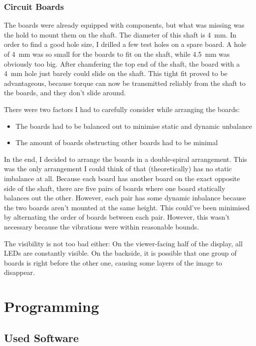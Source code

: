 \documentclass[a4paper, 11pt, titlepage]{report}
\begin{document}
\subsection{Circuit Boards}

The boards were already equipped with components, but what was missing was the hold to mount them
on the shaft. The diameter of this shaft is \SI{4}{\milli\meter}. In order to find a good hole
size, I drilled a few test holes on a spare board. A hole of \SI{4}{\milli\meter} was so small for
the boards to fit on the shaft, while \SI{4.5}{\milli\meter} was obviously too big. After
chamfering the top end of the shaft, the board with a \SI{4}{\milli\meter} hole just barely could
slide on the shaft. This tight fit proved to be advantageous, because torque can now be
transmitted reliably from the shaft to the boards, and they don't slide around.

There were two factors I had to carefully consider while arranging the boards:

\begin{itemize}
\item The boards had to be balanced out to minimise static and dynamic unbalance
\item The amount of boards obstructing other boards had to be minimal
\end{itemize}

In the end, I decided to arrange the boards in a double-spiral arrangement. This was the only
arrangement I could think of that (theoretically) has no static imbalance at all. Because each
board has another board on the exact opposite side of the shaft, there are five pairs of boards
where one board statically balances out the other. However, each pair has some dynamic inbalance
because the two boards aren't mounted at the same height. This could've been minimised by
alternating the order of boards between each pair. However, this wasn't necessary because the
vibrations were within reasonable bounds.

The visibility is not too bad either: On the viewer-facing half of the display, all LEDs are
constantly visible. On the backside, it is possible that one group of boards is right before the
other one, causing some layers of the image to disappear.


\chapter{Programming}

\section{Used Software}
\end{document}
